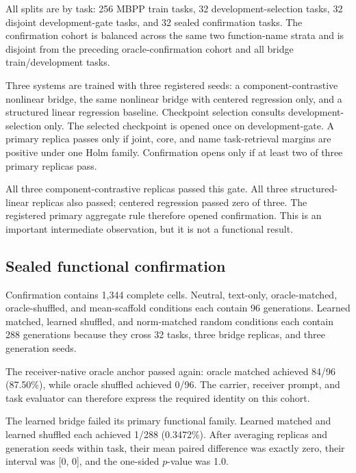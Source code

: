 \documentclass[11pt]{article}
\begin{document}
All splits are by task: 256 MBPP train tasks, 32 development-selection tasks, 32 disjoint development-gate tasks, and 32 sealed confirmation tasks. The confirmation cohort is balanced across the same two function-name strata and is disjoint from the preceding oracle-confirmation cohort and all bridge train/development tasks.

Three systems are trained with three registered seeds: a component-contrastive nonlinear bridge, the same nonlinear bridge with centered regression only, and a structured linear regression baseline. Checkpoint selection consults development-selection only. The selected checkpoint is opened once on development-gate. A primary replica passes only if joint, core, and name task-retrieval margins are positive under one Holm family. Confirmation opens only if at least two of three primary replicas pass.

All three component-contrastive replicas passed this gate. All three structured-linear replicas also passed; centered regression passed zero of three. The registered primary aggregate rule therefore opened confirmation. This is an important intermediate observation, but it is not a functional result.

\subsection{Sealed functional confirmation}

Confirmation contains 1,344 complete cells. Neutral, text-only, oracle-matched, oracle-shuffled, and mean-scaffold conditions each contain 96 generations. Learned matched, learned shuffled, and norm-matched random conditions each contain 288 generations because they cross 32 tasks, three bridge replicas, and three generation seeds.

The receiver-native oracle anchor passed again: oracle matched achieved 84/96 (87.50\%), while oracle shuffled achieved 0/96. The carrier, receiver prompt, and task evaluator can therefore express the required identity on this cohort.

The learned bridge failed its primary functional family. Learned matched and learned shuffled each achieved 1/288 (0.3472\%). After averaging replicas and generation seeds within task, their mean paired difference was exactly zero, their interval was [0, 0], and the one-sided \(p\)-value was 1.0.
\end{document}
